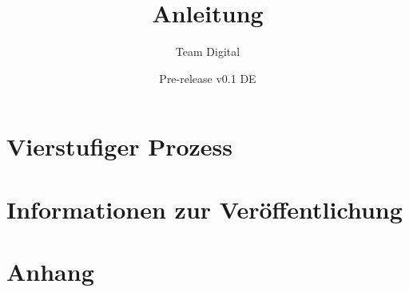 \documentclass[11pt]{book}
\title{Anleitung }
\author{Team Digital}
\date{Pre-release v0.1 DE}
\begin{document}
\maketitle
\def\title#1{\chapter{#1}}
\tableofcontents

        
        
        
        
        
        
\part{Vierstufiger Prozess }
        
        
        
        
        
        
        
        
\part{Informationen zur Veröffentlichung}
        
        
\part{Anhang}
        
        
\end{document}
